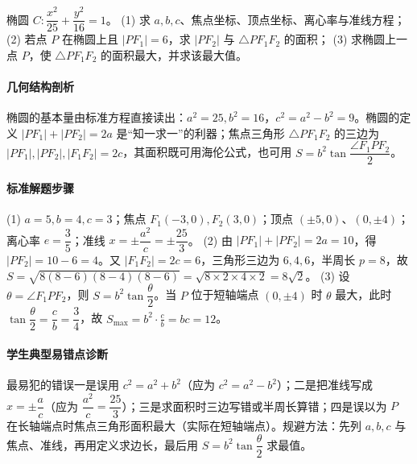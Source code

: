 \begin{problem}
椭圆 $C:\dfrac{x^2}{25}+\dfrac{y^2}{16}=1$。
(1) 求 $a,b,c$、焦点坐标、顶点坐标、离心率与准线方程；
(2) 若点 $P$ 在椭圆上且 $|PF_1|=6$，求 $|PF_2|$ 与 $\triangle PF_1F_2$ 的面积；
(3) 求椭圆上一点 $P$，使 $\triangle PF_1F_2$ 的面积最大，并求该最大值。
\end{problem}
\begin{solution}
\paragraph{几何结构剖析}
椭圆的基本量由标准方程直接读出：$a^2=25,b^2=16$，$c^2=a^2-b^2=9$。椭圆的定义 $|PF_1|+|PF_2|=2a$ 是“知一求一”的利器；焦点三角形 $\triangle PF_1F_2$ 的三边为 $|PF_1|,|PF_2|,|F_1F_2|=2c$，其面积既可用海伦公式，也可用 $S=b^2\tan\dfrac{\angle F_1PF_2}{2}$。
\paragraph{标准解题步骤}
(1) $a=5,b=4,c=3$；焦点 $F_1(-3,0),F_2(3,0)$；顶点 $(\pm5,0)$、$(0,\pm4)$；离心率 $e=\dfrac35$；准线 $x=\pm\dfrac{a^2}{c}=\pm\dfrac{25}{3}$。
(2) 由 $|PF_1|+|PF_2|=2a=10$，得 $|PF_2|=10-6=4$。又 $|F_1F_2|=2c=6$，三角形三边为 $6,4,6$，半周长 $p=8$，故
$S=\sqrt{8(8-6)(8-4)(8-6)}=\sqrt{8\times2\times4\times2}=8\sqrt2$。
(3) 设 $\theta=\angle F_1PF_2$，则 $S=b^2\tan\dfrac\theta2$。当 $P$ 位于短轴端点 $(0,\pm4)$ 时 $\theta$ 最大，此时 $\tan\dfrac\theta2=\dfrac cb=\dfrac34$，故
$S_{\max}=b^2\cdot\frac cb=bc=12$。
\paragraph{学生典型易错点诊断}
最易犯的错误一是误用 $c^2=a^2+b^2$（应为 $c^2=a^2-b^2$）；二是把准线写成 $x=\pm\dfrac ac$（应为 $\dfrac{a^2}{c}=\dfrac{25}{3}$）；三是求面积时三边写错或半周长算错；四是误以为 $P$ 在长轴端点时焦点三角形面积最大（实际在短轴端点）。规避方法：先列 $a,b,c$ 与焦点、准线，再用定义求边长，最后用 $S=b^2\tan\dfrac\theta2$ 求最值。
\end{solution}

